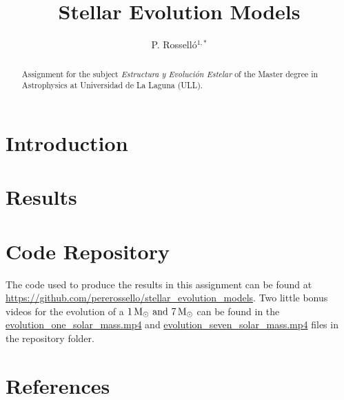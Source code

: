 \documentclass{anotherarticlestyle}
\title{Stellar Evolution Models}
\author{P. Rosselló$^{1,*}$}
\begin{document}
\maketitle

\begin{strip}
    \begin{abstract}
        {\small
            Assignment for the subject \textit{Estructura y Evolución Estelar} of the Master degree in Astrophysics at Universidad de La Laguna (ULL).
        }
    \end{abstract}
\end{strip}




\section{Introduction}


\section{Results}

\newpage
\section{Code Repository}
The code used to produce the results in this assignment can be found at \url{https://github.com/pererossello/stellar_evolution_models}. Two little bonus videos for the evolution of a $1 \, {\rm M}_\odot \ \text{and} \ 7 \,  {\rm M}_\odot$ can be found in the \url{evolution_one_solar_mass.mp4} and \url{evolution_seven_solar_mass.mp4} files in the repository folder.

\newpage
\pagebreak
\onecolumn
\twocolumn


\section*{References}




% 




% 

% 
\end{document}
